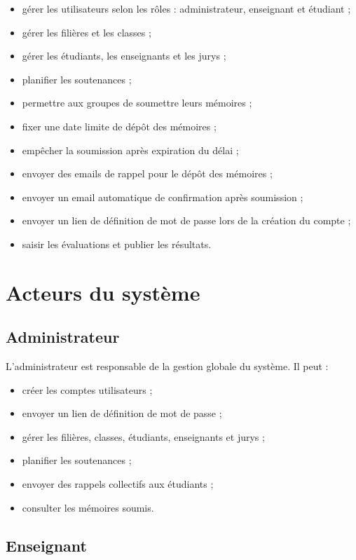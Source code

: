 \documentclass[a4paper,12pt,oneside]{report}
\begin{document}
\begin{itemize}
    \item gérer les utilisateurs selon les rôles : administrateur, enseignant et étudiant ;
    \item gérer les filières et les classes ;
    \item gérer les étudiants, les enseignants et les jurys ;
    \item planifier les soutenances ;
    \item permettre aux groupes de soumettre leurs mémoires ;
    \item fixer une date limite de dépôt des mémoires ;
    \item empêcher la soumission après expiration du délai ;
    \item envoyer des emails de rappel pour le dépôt des mémoires ;
    \item envoyer un email automatique de confirmation après soumission ;
    \item envoyer un lien de définition de mot de passe lors de la création du compte ;
    \item saisir les évaluations et publier les résultats.
\end{itemize}

\section{Acteurs du système}

\subsection{Administrateur}

L'administrateur est responsable de la gestion globale du système. Il peut :
\begin{itemize}
    \item créer les comptes utilisateurs ;
    \item envoyer un lien de définition de mot de passe ;
    \item gérer les filières, classes, étudiants, enseignants et jurys ;
    \item planifier les soutenances ;
    \item envoyer des rappels collectifs aux étudiants ;
    \item consulter les mémoires soumis.
\end{itemize}

\subsection{Enseignant}
\end{document}
